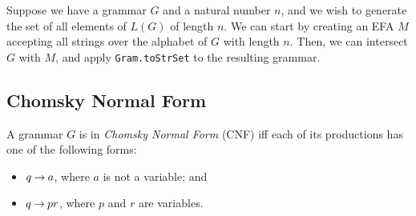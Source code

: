 Suppose we have a grammar $G$ and a natural number $n$, and we wish to
generate the set of all elements of $L(G)$ of length $n$.  We can start by
creating an EFA $M$ accepting all strings over the alphabet of $G$
with length $n$.  Then, we can intersect $G$ with $M$, and apply
\texttt{Gram.toStrSet} to the resulting grammar.

\subsection{Chomsky Normal Form}

%
%
A grammar $G$ is in \emph{Chomsky Normal Form} (CNF) iff
each of its productions has one of the following forms:
\begin{itemize}
\item $q\mathbin{\to} a$, where $a$ is not a variable; and

\item $q\mathbin{\to} pr$, where $p$ and $r$ are variables.
\end{itemize}

